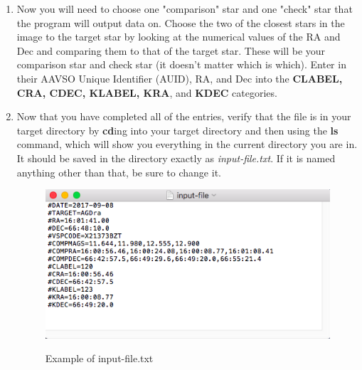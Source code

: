 \documentclass[11pt]{report}
\begin{document}
\begin{enumerate}
\item Now you will need to choose one "comparison" star and one "check" star that the program will output data on. Choose the two of the closest stars in the image to the target star by looking at the numerical values of the RA and Dec and comparing them to that of the target star. These will be your comparison star and check star (it doesn't matter which is which). Enter in their AAVSO Unique Identifier (AUID), RA, and Dec into the {\bf CLABEL, CRA, CDEC, KLABEL, KRA}, and {\bf KDEC} categories. 
\item Now that you have completed all of the entries, verify that the file is in your target directory by {\bf cd}ing into your target directory and then using the {\bf ls} command, which will show you everything in the current directory you are in. It should be saved in the directory exactly as \emph{input-file.txt}. If it is named anything other than that, be sure to change it. 
\begin{figure}[!h]
\begin{center}
\includegraphics[totalheight=.3\textheight]{example.png}
\end{center}
\begin{center}
\small{Example of input-file.txt}
\end{center}
\end{figure}
\end{enumerate}
\end{document}

